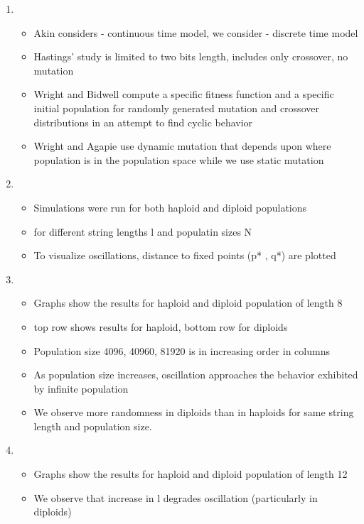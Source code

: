 \documentclass{article}
\begin{document}
\begin{enumerate}
    
\item
  \begin{itemize}
  \item Akin considers - continuous time model, we consider -
    discrete time model
   \item Hastings' study is limited to two bits length, includes only
     crossover, no mutation
  \item Wright and Bidwell compute a specific fitness function and a
    specific initial population for randomly generated mutation and
    crossover distributions in an attempt to find cyclic behavior
  \item Wright and Agapie use dynamic mutation that depends upon
    where population is in the population space while we use static
    mutation
  \end{itemize}

\item
  \begin{itemize}
  \item Simulations were run for both haploid and diploid populations
  \item for different string lengths l and populatin sizes N
  \item To visualize oscillations, distance to fixed points (p*
    , q*) are plotted
  \end{itemize}
    
\item
  \begin{itemize}
  \item Graphs show the results for haploid and diploid population of
    length 8
   \item top row shows results for haploid, bottom row for diploids
  \item Population size {4096, 40960, 81920} is in increasing order in columns
  \item As population size increases, oscillation approaches the
    behavior exhibited by infinite population
  \item We observe more randomness in diploids than in haploids for
    same string length and population size.
  \end{itemize}
    
\item
  \begin{itemize}
  \item Graphs show the results for haploid and diploid population of
    length 12
   \item We observe that increase in l degrades oscillation (particularly in diploids)
  \end{itemize}
    

\end{enumerate}
\end{document}
